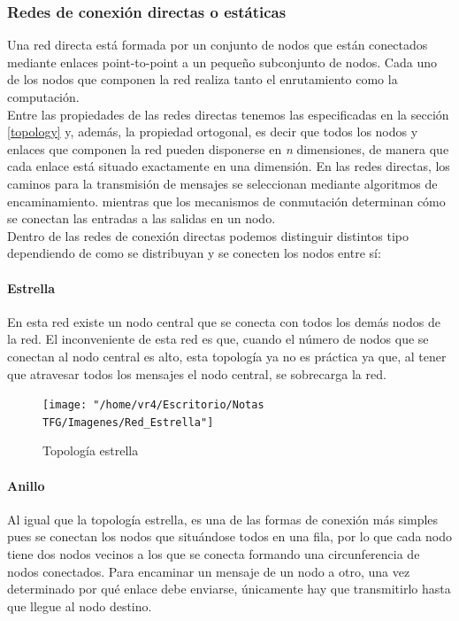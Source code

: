 \subsubsection{Redes de conexión directas o estáticas}
Una red directa está formada por un conjunto de nodos que están conectados mediante enlaces point-to-point a un pequeño subconjunto de nodos. Cada uno de los nodos que componen la red realiza tanto el enrutamiento como la computación.\\
Entre las propiedades de las redes directas tenemos las especificadas en la sección \ref{topology} y, además, la propiedad ortogonal, es decir que todos los nodos y enlaces que componen la red pueden disponerse en \textit{n} dimensiones, de manera que cada enlace está situado exactamente en una dimensión. En las redes directas, los caminos para la transmisión de mensajes se seleccionan mediante algoritmos de encaminamiento. mientras que los mecanismos de conmutación determinan cómo se conectan las entradas a las salidas en un nodo.\\

Dentro de las redes de conexión directas podemos distinguir distintos tipo dependiendo de como se distribuyan y se conecten los nodos entre sí:

\paragraph{Estrella} 
En esta red existe un nodo central que se conecta con todos los demás nodos de la red. El inconveniente de esta red es que, cuando el número de nodos que se conectan al nodo central es alto, esta topología ya no es práctica ya que, al tener que atravesar todos los mensajes el nodo central, se sobrecarga la red.

\begin{figure}[!h]
	\centering
	\texttt{[image: "/home/vr4/Escritorio/Notas TFG/Imagenes/Red\_Estrella"]}
	\caption{Topología estrella}
	\label{fig:redestrella}
\end{figure}

\paragraph{Anillo}
Al igual que la topología estrella, es una de las formas de conexión más simples pues se conectan los nodos que situándose todos en una fila, por lo que cada nodo tiene dos nodos vecinos a los que se conecta formando una circunferencia de nodos conectados. Para encaminar un mensaje de un nodo a otro, una vez determinado por  qué enlace debe enviarse, únicamente hay que transmitirlo hasta que llegue al nodo destino. 

